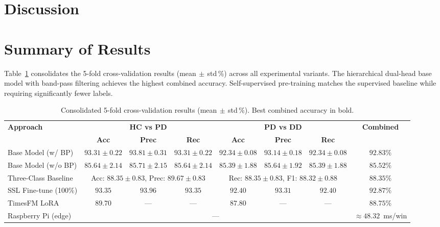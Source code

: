 \documentclass[conference]{IEEEtran}
\begin{document}
\section{Discussion}

\section{Summary of Results}

Table~\ref{tab:summary} consolidates the 5-fold cross-validation results (mean$\,\pm\,$std\,\%) across all experimental variants. The hierarchical dual-head base model with band-pass filtering achieves the highest combined accuracy. Self-supervised pre-training matches the supervised baseline while requiring significantly fewer labels.

\begin{table}[t]
\centering
\caption{Consolidated 5-fold cross-validation results (mean$\,\pm\,$std\,\%). Best combined accuracy in bold.}
\label{tab:summary}
\begin{tabular}{lccccccc}
\toprule
\multirow{2}{*}{\textbf{Approach}} &
  \multicolumn{3}{c}{\textbf{HC vs PD}} &
  \multicolumn{3}{c}{\textbf{PD vs DD}} &
  \multirow{2}{*}{\textbf{Combined}} \\
\cmidrule(lr){2-4}\cmidrule(lr){5-7}
& \textbf{Acc} & \textbf{Prec} & \textbf{Rec}
& \textbf{Acc} & \textbf{Prec} & \textbf{Rec} & \\
\midrule
Base Model (w/ BP)   & $93.31{\pm}0.22$ & $93.81{\pm}0.31$ & $93.31{\pm}0.22$ & $92.34{\pm}0.08$ & $93.14{\pm}0.18$ & $92.34{\pm}0.08$ & $\mathbf{92.83\%}$ \\
Base Model (w/o BP)  & $85.64{\pm}2.14$ & $85.71{\pm}2.15$ & $85.64{\pm}2.14$ & $85.39{\pm}1.88$ & $85.64{\pm}1.92$ & $85.39{\pm}1.88$ & $85.52\%$ \\
Three-Class Baseline & \multicolumn{3}{c}{Acc: $88.35{\pm}0.83$, Prec: $89.67{\pm}0.83$} & \multicolumn{3}{c}{Rec: $88.35{\pm}0.83$, F1: $88.32{\pm}0.88$} & $88.35\%$ \\
SSL Fine-tune (100\%)& $93.35$ & $93.96$ & $93.35$ & $92.40$ & $93.31$ & $92.40$ & $92.87\%$ \\
TimesFM LoRA         & $89.70$ & --- & --- & $87.80$ & --- & --- & $88.75\%$ \\
\midrule
Raspberry Pi (edge)  & \multicolumn{6}{c}{---} & $\approx48.32$~ms/win \\
\bottomrule
\end{tabular}
\end{table}
\end{document}
